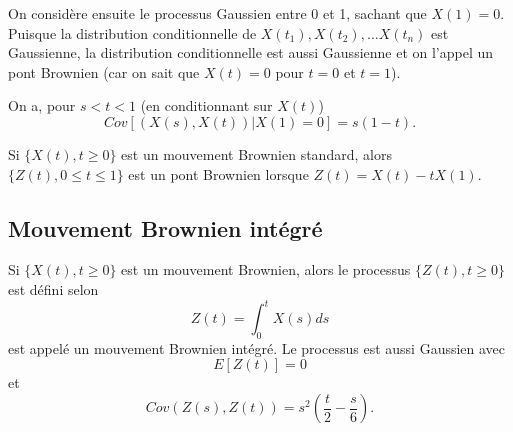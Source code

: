 On considère ensuite le processus Gaussien entre 0 et 1, sachant que $X(1) = 0$. Puisque la distribution conditionnelle de $X(t_1), X(t_2), \dots X(t_n)$ est Gaussienne, la distribution conditionnelle est aussi Gaussienne et on l'appel un pont Brownien (car on sait que $X(t) = 0$ pour $t=0$ et $t=1$). 

On a, pour $s<t<1$ (en conditionnant sur $X(t)$)
$$Cov[(X(s), X(t)) \vert X(1) = 0] = s(1-t).$$

\begin{proposition}{}{}
	Si $\{X(t), t\geq 0\}$ est un mouvement Brownien standard, alors $\{Z(t), 0\leq t \leq 1\}$ est un pont Brownien lorsque $Z(t) = X(t) - tX(1)$.
\end{proposition}

\subsection{Mouvement Brownien intégré}

Si $\{X(t), t\geq 0\}$ est un mouvement Brownien, alors le processus $\{Z(t), t\geq 0\}$ est défini selon
$$Z(t) = \int_{0}^{t} X(s) ds$$
est appelé un mouvement Brownien intégré. Le processus est aussi Gaussien avec 
$$E[Z(t)] = 0$$
et
$$Cov(Z(s), Z(t)) = s^2\left(\frac{t}{2} - \frac{s}{6}\right).$$





































